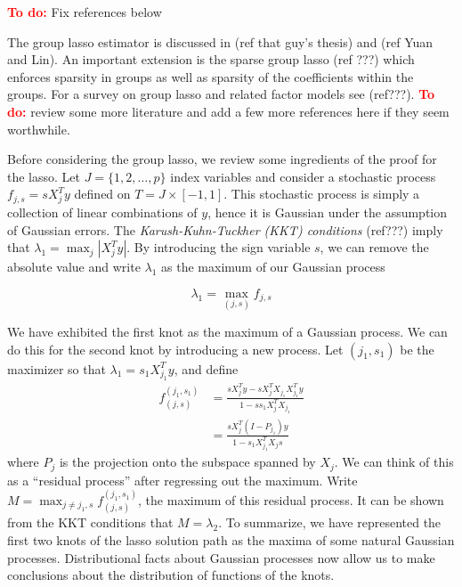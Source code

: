 \documentclass{imsart}
\newcommand{\todo}{\textcolor{red}{\textbf{To do: }}}
\begin{document}

\todo Fix references below

The group lasso estimator is discussed in (ref that guy's thesis) and
(ref Yuan and Lin).  An important extension is the sparse group lasso
(ref ???) which enforces sparsity in groups as well as sparsity of the
coefficients within the groups.  For a survey on group lasso and
related factor models see (ref???). \todo review some more literature
and add a few more references here if they seem worthwhile. 


Before considering the group lasso, we review some ingredients of the
proof for the lasso. Let $J = \{ 1, 2, \ldots, p \}$ index variables
and consider a stochastic process $f_{j,s} = sX_j^Ty$ defined on $T =
J \times [ -1, 1 ]$. This stochastic process is simply a collection of
linear combinations of $y$, hence it is Gaussian under the assumption
of Gaussian errors. The \emph{Karush-Kuhn-Tuckher (KKT) conditions}
(ref???) imply that $\lambda_1 = \max_j |X_j^Ty|$. By introducing the
sign variable $s$, we can remove the absolute value and write
$\lambda_1$ as the maximum of our Gaussian process 

\begin{equation}
\lambda_1 = \max_{(j,s)} f_{j,s}
\end{equation}

We have exhibited the first knot as the maximum of a Gaussian
process. We can do this for the second knot by introducing a new
process. Let $(j_1, s_1)$ be the maximizer so that $\lambda_1 =
s_1X_{j_1}^Ty$, and define 
\begin{equation}
\begin{aligned}
  f^{(j_1,s_1)}_{(j,s)} & = \frac{ sX_j^T y - s X_j^T X_{j_1} X_{j_1}^Ty  } { 1 -  ss_1 X_j^TX_{j_1}} \\
  & = \frac{ sX_j^T(I-P_{j_1}) y }{ 1 -  s_1 X_{j_1}^T X_js}
\end{aligned}
\end{equation}
where $P_j$ is the projection onto the subspace spanned by $X_j$. We
can think of this as a ``residual process'' after regressing out the
maximum. Write $M = \max_{j \neq j_1, s} f^{(j_1,s_1)}_{(j,s)}$, the
maximum of this residual process. It can be shown from the KKT
conditions that $M  = \lambda_2$. To summarize, we have represented
the first two knots of the lasso solution path as the maxima of some
natural Gaussian processes. Distributional facts about Gaussian
processes now allow us to make conclusions about the distribution of
functions of the knots. 
\end{document}
